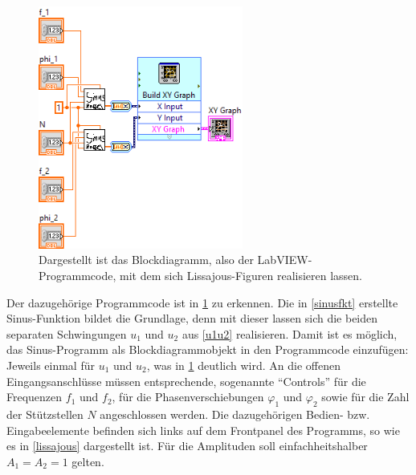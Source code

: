 \documentclass[
a4paper,
12pt,
pagesize,
ngerman
]{scrartcl}
\begin{document}
	\begin{figure}[H]
		\centering
		\includegraphics[width=0.6\textwidth]{EIRE2018Dateien/Tag1/lissajous-bilder/Lissajousd}
		\caption{Dargestellt ist das Blockdiagramm, also der LabVIEW-Programmcode, mit dem sich Lissajous-Figuren realisieren lassen.}
		\label{lissajousprogrammcode}
	\end{figure}

	\noindent Der dazugehörige Programmcode ist in \cref{lissajousprogrammcode} zu erkennen. Die in \cref{sinusfkt} erstellte Sinus-Funktion bildet die Grundlage, denn mit dieser lassen sich die beiden separaten Schwingungen $u_1$ und $u_2$ aus \cref{u1u2} realisieren. Damit ist es möglich, das Sinus-Programm als Blockdiagrammobjekt in den Programmcode einzufügen: Jeweils einmal für $u_1$ und $u_2$, was in \cref{lissajousprogrammcode} deutlich wird. An die offenen Eingangsanschlüsse müssen entsprechende, sogenannte \enquote{Controls} für die Frequenzen $f_1$ und $f_2$, für die Phasenverschiebungen $\varphi_1$ und $\varphi_2$ sowie für die Zahl der Stützstellen $N$ angeschlossen werden. Die dazugehörigen Bedien- bzw. Eingabeelemente befinden sich links auf dem Frontpanel des Programms, so wie es in \cref{lissajous} dargestellt ist. Für die Amplituden soll einfachheitshalber $A_1 = A_2 = 1$ gelten.
\end{document}
